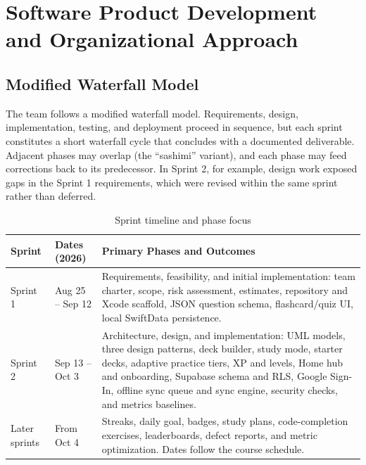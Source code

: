 \documentclass[12pt,letterpaper]{article}
\begin{document}
\section{Software Product Development and Organizational Approach}\label{sec:process}

\subsection{Modified Waterfall Model}
The team follows a modified waterfall model. Requirements, design, implementation,
testing, and deployment proceed in sequence, but each sprint constitutes a short
waterfall cycle that concludes with a documented deliverable. Adjacent phases may
overlap (the ``sashimi'' variant), and each phase may feed corrections back to its
predecessor. In Sprint 2, for example, design work exposed gaps in the Sprint 1
requirements, which were revised within the same sprint rather than deferred.

\begin{table}[H]
\centering
\caption{Sprint timeline and phase focus}
\label{tab:timeline}
\begin{tabularx}{\textwidth}{@{}l L{3.6cm} Y@{}}
\toprule
\textbf{Sprint} & \textbf{Dates (2026)} & \textbf{Primary Phases and Outcomes} \\
\midrule
Sprint 1 & Aug 25 -- Sep 12 & Requirements, feasibility, and initial implementation: team charter, scope, risk assessment, estimates, repository and Xcode scaffold, JSON question schema, flashcard/quiz UI, local SwiftData persistence. \\
Sprint 2 & Sep 13 -- Oct 3 & Architecture, design, and implementation: UML models, three design patterns, deck builder, study mode, starter decks, adaptive practice tiers, XP and levels, Home hub and onboarding, Supabase schema and RLS, Google Sign-In, offline sync queue and sync engine, security checks, and metrics baselines. \\
Later sprints & From Oct 4 & Streaks, daily goal, badges, study plans, code-completion exercises, leaderboards, defect reports, and metric optimization. Dates follow the course schedule. \\
\bottomrule
\end{tabularx}
\end{table}
\end{document}
